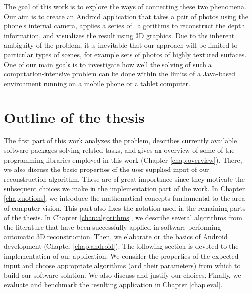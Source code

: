 The goal of this work is to explore the ways of connecting these two phenomena. 
Our aim is to create an Android application that takes a pair of photos using the phone's internal camera, applies a series of \cv\ algorithms to reconstruct the depth information, and visualizes the result using 3D graphics. %
Due to the inherent ambiguity of the problem, it is inevitable that our approach will be limited to particular types of scenes, for example sets of photos of highly textured surfaces. 
One of our main goals is to investigate how well the solving of such a computation-intensive problem can be done within the limits of a Java-based environment running on a mobile phone or a tablet computer.

\section*{Outline of the thesis}

The first part of this work analyzes the problem, describes currently available software packages solving related tasks, and gives an overview of some of the programming libraries employed in this work (Chapter \ref{chap:overview}). 
There, we also discuss the basic properties of the user supplied input of our reconstruction algorithm. 
These are of great importance since they motivate the subsequent choices we make in the implementation part of the work.
In Chapter \ref{chap:notions}, we introduce the mathematical concepts fundamental to the area of computer vision. 
This part also fixes the notation used in the remaining parts of the thesis. 
In Chapter \ref{chap:algorithms}, we describe several algorithms from the literature that have been successfully applied in software performing automatic 3D reconstruction. 
Then, we elaborate on the basics of Android development (Chapter \ref{chap:android}).
The following section is devoted to the implementation of our application.
We consider the properties of the expected input and choose appropriate algorithms (and their parameters) from which to build our software solution. 
We also discuss and justify our choices. 
Finally, we evaluate and benchmark the resulting application in Chapter \ref{chap:eval}.

